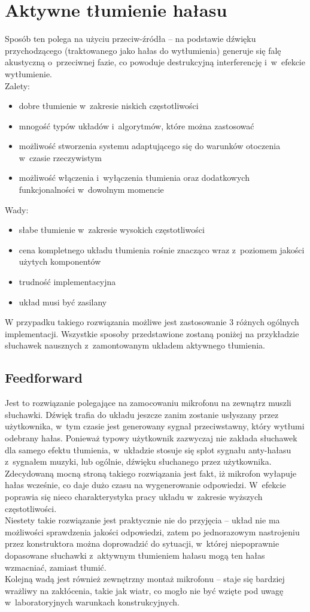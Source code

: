 \section{Aktywne tłumienie hałasu}
\label{sec:ANC}
Sposób ten polega na użyciu przeciw-źródła -- na podstawie dźwięku przychodzącego (traktowanego jako hałas do wytłumienia) generuje się falę akustyczną o~przeciwnej fazie, co powoduje destrukcyjną interferencję i~w~efekcie wytłumienie.\\
Zalety:
\begin{itemize}
	\item dobre tłumienie w~zakresie niskich częstotliwości
	\item mnogość typów układów i~algorytmów, które można zastosować
	\item możliwość stworzenia systemu adaptującego się do warunków otoczenia w~czasie rzeczywistym
	\item możliwość włączenia i~wyłączenia tłumienia oraz dodatkowych funkcjonalności w~dowolnym momencie
\end{itemize}
Wady:
\begin{itemize}
	\item słabe tłumienie w~zakresie wysokich częstotliwości
	\item cena kompletnego układu tłumienia rośnie znacząco wraz z~poziomem jakości użytych komponentów
	\item trudność implementacyjna
	\item układ musi być zasilany
\end{itemize}
W przypadku takiego rozwiązania możliwe jest zastosowanie 3 różnych ogólnych implementacji. Wszystkie sposoby przedstawione zostaną poniżej na przykładzie słuchawek nausznych z~zamontowanym układem aktywnego tłumienia.
\subsection{Feedforward}
\label{feedforward}
Jest to rozwiązanie polegające na zamocowaniu mikrofonu na zewnątrz muszli słuchawki. Dźwięk trafia do układu jeszcze zanim zostanie usłyszany przez użytkownika, w~tym czasie jest generowany sygnał przeciwstawny, który wytłumi odebrany hałas. Ponieważ typowy użytkownik zazwyczaj nie zakłada słuchawek dla samego efektu tłumienia, w~układzie stosuje się splot sygnału anty-hałasu z~sygnałem muzyki, lub ogólnie, dźwięku słuchanego przez użytkownika.\\
Zdecydowaną mocną stroną takiego rozwiązania jest fakt, iż mikrofon wyłapuje hałas wcześnie, co daje dużo czasu na wygenerowanie odpowiedzi. W~efekcie poprawia się nieco charakterystyka pracy układu w~zakresie wyższych częstotliwości.\\
Niestety takie rozwiązanie jest praktycznie nie do przyjęcia -- układ nie ma możliwości sprawdzenia jakości odpowiedzi, zatem po jednorazowym nastrojeniu przez konstruktora można doprowadzić do sytuacji, w~której niepoprawnie dopasowane słuchawki z~aktywnym tłumieniem hałasu mogą ten hałas wzmacniać, zamiast tłumić.\\
Kolejną wadą jest również zewnętrzny montaż mikrofonu -- staje się bardziej wrażliwy na zakłócenia, takie jak wiatr, co mogło nie być wzięte pod uwagę w~laboratoryjnych warunkach konstrukcyjnych.
